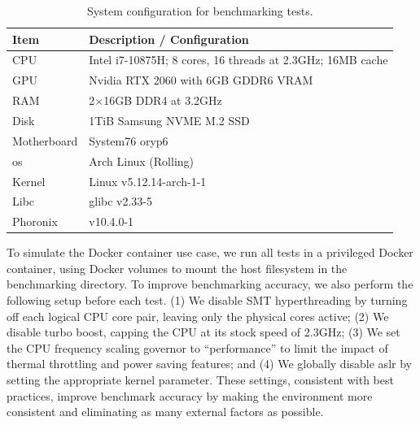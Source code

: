 \documentclass[
  fontsize=12pt,
  titlepage=firstiscover,
  paper=letter,
oneside,
  cleardoublepage=plain,
  parskip=half-,
  DIV=10,
  parindent,
  appendixprefix,
  chapterprefix,
  listof=totoc,
]{scrbook}
\begin{document}
\begin{table}[htp]
  \centering
  \footnotesize
  \caption[System configuration for benchmarking tests]{System configuration for benchmarking tests.}\label{tab:system-config}
  \begin{tabular}{ll}
  \toprule
  Item & Description / Configuration \\
  \midrule
  CPU & Intel i7-10875H; 8 cores, 16 threads at 2.3GHz; 16MB cache\\
  GPU & Nvidia RTX 2060 with 6GB GDDR6 VRAM \\
  RAM & 2$\times$16GB DDR4 at 3.2GHz \\
  Disk & 1TiB Samsung NVME M.2 SSD \\
  Motherboard & System76 oryp6 \\
  \midrule
  \gls{os} & Arch Linux (Rolling) \\
  Kernel & Linux v5.12.14-arch-1-1 \\
  Libc & glibc v2.33-5 \\
  Phoronix & v10.4.0-1 \\
  \bottomrule
  \end{tabular}
\end{table}

To simulate the Docker container use case, we run all tests in a privileged Docker
container, using Docker volumes to mount the host filesystem in the benchmarking
directory. To improve benchmarking accuracy, we also perform the following setup before
each test. (1) We disable SMT hyperthreading by turning off each logical CPU core pair,
leaving only the physical cores active; (2) We disable turbo boost, capping the CPU at its
stock speed of 2.3GHz; (3) We set the CPU frequency scaling governor to
\enquote{performance} to limit the impact of thermal throttling and power saving features;
and (4) We globally disable \gls{aslr} by setting the appropriate kernel parameter. These
settings, consistent with best practices, improve benchmark accuracy by making the
environment more consistent and eliminating as many external factors as possible.
\end{document}
